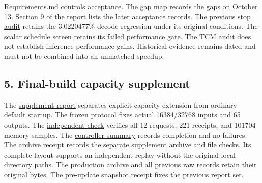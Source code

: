 \documentclass[10pt,a4paper]{article}
\begin{document}
\href{https://github.com/MoyaMryia/riscv-accl/blob/main/Requirements.md}{Requirements.md}
controls acceptance. The
\href{https://github.com/MoyaMryia/riscv-accl/blob/main/spacemit/reports/2026-10-13-requirements-gap.md}{gap
map} records the gaps on October 13. Section 9 of the report lists the
later acceptance records. The
\href{https://github.com/MoyaMryia/riscv-accl/blob/main/spacemit/reports/2026-10-12-combined-stop-audit.md}{previous
stop audit} retains the 3.0220477\% decode regression under its original
conditions. The
\href{https://github.com/MoyaMryia/riscv-accl/blob/main/spacemit/reports/2026-10-13-k1-live-inspect-and-scalar-schedule.md}{scalar
schedule screen} retains its failed performance gate. The
\href{https://github.com/MoyaMryia/riscv-accl/blob/main/spacemit/reports/2026-10-13-k1-tcm-access.md}{TCM
audit} does not establish inference performance gains. Historical
evidence remains dated and must not be combined into an unmatched
speedup.

\hypertarget{final-build-capacity-supplement}{%
\subsection{5. Final-build capacity
supplement}\label{final-build-capacity-supplement}}

The
\href{https://github.com/MoyaMryia/riscv-accl/blob/main/spacemit/reports/2026-10-16-ultralong-final-comparison.md}{supplement
report} separates explicit capacity extension from ordinary default
startup. The
\href{https://github.com/MoyaMryia/riscv-accl/blob/main/spacemit/reports/raw/k1-ultralong-20261016-r1/PROTOCOL.md}{frozen
protocol} fixes actual 16384/32768 inputs and 65 outputs. The
\href{https://github.com/MoyaMryia/riscv-accl/blob/main/spacemit/reports/raw/k1-ultralong-20261016-r1/verification-v2.json}{independent
check} verifies all 12 requests, 221 receipts, and 101704 memory
samples. The
\href{https://github.com/MoyaMryia/riscv-accl/blob/main/spacemit/reports/raw/k1-ultralong-20261016-r1/board/k1-ultralong-20261014-r1/results/summary.json}{controller
summary} records completion and no failures. The
\href{https://github.com/MoyaMryia/riscv-accl/blob/main/spacemit/reports/raw/k1-ultralong-20261016-r1/archive-receipt.json}{archive
receipt} records the separate supplement archive and file checks. Its
complete layout supports an independent replay without the original
local directory paths. The production archive and all previous raw
records retain their original bytes. The
\href{https://github.com/MoyaMryia/riscv-accl/blob/main/spacemit/reports/snapshots/2026-10-14-final-r3/snapshot-receipt.json}{pre-update
snapshot receipt} fixes the previous report set.
\end{document}
